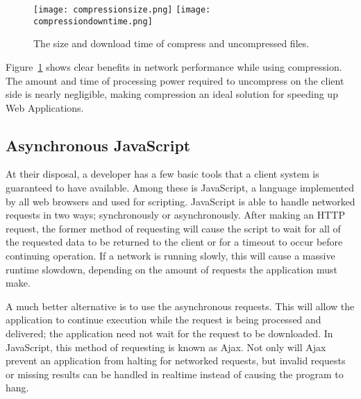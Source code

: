\documentclass{acmsmall}
\begin{document}
\begin{figure}[h]
\begin{center}
\texttt{[image: compressionsize.png]}
\texttt{[image: compressiondowntime.png]}
\caption{The size and download time of compress and uncompressed files\cite{performanceEnter}.}
\end{center}
\label{fig:compression}
\end{figure}

Figure~\ref{fig:compression} shows clear benefits in network performance while using compression.  The amount and time of processing power required to uncompress on the client side is nearly negligible, making compression an ideal solution for speeding up Web Applications.\cite{performanceEnter}

\subsection{Asynchronous JavaScript}

At their disposal, a developer has a few basic tools that a client system is guaranteed to have available.  Among these is JavaScript, a language implemented by all web browsers and used for scripting.  JavaScript is able to handle networked requests in two ways; synchronously or asynchronously.  After making an HTTP request, the former method of requesting will cause the script to wait for all of the requested data to be returned to the client or for a timeout to occur before continuing operation\cite{performanceEnter}.  If a network is running slowly, this will cause a massive runtime slowdown, depending on the amount of requests the application must make.

A much better alternative is to use the asynchronous requests.  This will allow the application to continue execution while the request is being processed and delivered; the application need not wait for the request to be downloaded.  In JavaScript, this method of requesting is known as Ajax\cite{performanceEnter}.  Not only will Ajax prevent an application from halting for networked requests, but invalid requests or missing results can be handled in realtime instead of causing the program to hang.
\end{document}
